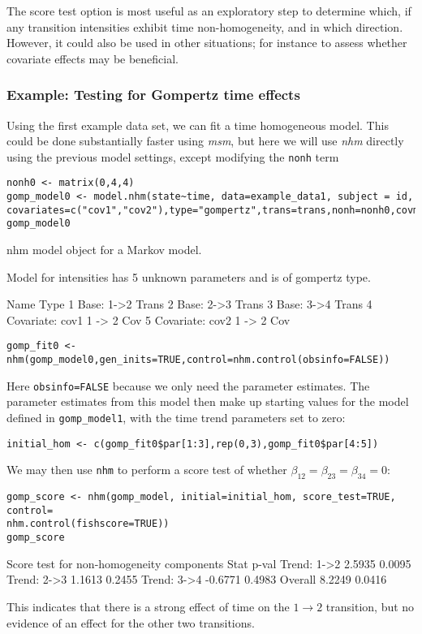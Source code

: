 \documentclass{article}
\numberwithin{equation}{section}
\begin{document}
The score test option is most useful as an exploratory step to determine which, if any transition intensities exhibit time non-homogeneity, and in which direction. However, it could also be used in other situations; for instance to assess whether covariate effects may be beneficial.

\subsubsection{Example: Testing for Gompertz time effects}

Using the first example data set, we can fit a time homogeneous model. This could be done substantially faster using {\it msm}, but here we will use {\it nhm} directly using the previous model settings, except modifying the \verb!nonh! term

\begin{verbatim}
nonh0 <- matrix(0,4,4)
gomp_model0 <- model.nhm(state~time, data=example_data1, subject = id,
covariates=c("cov1","cov2"),type="gompertz",trans=trans,nonh=nonh0,covm=covm)
gomp_model0
\end{verbatim}
\begin{verbout}
nhm model object for a Markov model.

Model for intensities has 5 unknown parameters and is of gompertz type.

                    Name  Type
1             Base: 1->2 Trans
2             Base: 2->3 Trans
3             Base: 3->4 Trans
4 Covariate: cov1 1 -> 2   Cov
5 Covariate: cov2 1 -> 2   Cov
\end{verbout}
\begin{verbatim}
gomp_fit0 <- nhm(gomp_model0,gen_inits=TRUE,control=nhm.control(obsinfo=FALSE))
\end{verbatim}
Here \verb!obsinfo=FALSE! because we only need the parameter estimates. The parameter estimates from this model then make up starting values for the model defined in \verb!gomp_model1!, with the time trend parameters set to zero:
\begin{verbatim}
initial_hom <- c(gomp_fit0$par[1:3],rep(0,3),gomp_fit0$par[4:5])
\end{verbatim}
We may then use \verb!nhm! to perform a score test of whether $\beta_{12} = \beta_{23} = \beta_{34} =0$:
\begin{verbatim}
gomp_score <- nhm(gomp_model, initial=initial_hom, score_test=TRUE, control=
nhm.control(fishscore=TRUE))
gomp_score
\end{verbatim}
\begin{verbout}
Score test for non-homogeneity components 
               Stat  p-val
Trend: 1->2  2.5935 0.0095
Trend: 2->3  1.1613 0.2455
Trend: 3->4 -0.6771 0.4983
Overall      8.2249 0.0416
\end{verbout}
This indicates that there is a strong effect of time on the $1 \rightarrow 2$ transition, but no evidence of an effect for the other two transitions.
\end{document}
